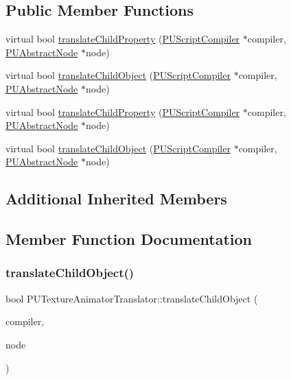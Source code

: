 \subsection*{Public Member Functions}
\begin{DoxyCompactItemize}
\item 
virtual bool \hyperlink{classPUTextureAnimatorTranslator_ae1e941014e7aef7397e11a0b46a4419a}{translate\+Child\+Property} (\hyperlink{classPUScriptCompiler}{P\+U\+Script\+Compiler} $\ast$compiler, \hyperlink{classPUAbstractNode}{P\+U\+Abstract\+Node} $\ast$node)
\item 
virtual bool \hyperlink{classPUTextureAnimatorTranslator_a674892250339a1dbe3ac6a794fdb3205}{translate\+Child\+Object} (\hyperlink{classPUScriptCompiler}{P\+U\+Script\+Compiler} $\ast$compiler, \hyperlink{classPUAbstractNode}{P\+U\+Abstract\+Node} $\ast$node)
\item 
virtual bool \hyperlink{classPUTextureAnimatorTranslator_a268f600cea9abcf17f82a8fb58620bdd}{translate\+Child\+Property} (\hyperlink{classPUScriptCompiler}{P\+U\+Script\+Compiler} $\ast$compiler, \hyperlink{classPUAbstractNode}{P\+U\+Abstract\+Node} $\ast$node)
\item 
virtual bool \hyperlink{classPUTextureAnimatorTranslator_ad16b7551c63fa2810daa385bf4083dba}{translate\+Child\+Object} (\hyperlink{classPUScriptCompiler}{P\+U\+Script\+Compiler} $\ast$compiler, \hyperlink{classPUAbstractNode}{P\+U\+Abstract\+Node} $\ast$node)
\end{DoxyCompactItemize}
\subsection*{Additional Inherited Members}


\subsection{Member Function Documentation}
\mbox{\label{classPUTextureAnimatorTranslator_a674892250339a1dbe3ac6a794fdb3205}} 
\subsubsection{\texorpdfstring{translate\+Child\+Object()}{translateChildObject()}\hspace{0.1cm}{\footnotesize\ttfamily [1/2]}}
{\footnotesize\ttfamily bool P\+U\+Texture\+Animator\+Translator\+::translate\+Child\+Object (\begin{DoxyParamCaption}\item[{\hyperlink{classPUScriptCompiler}{P\+U\+Script\+Compiler} $\ast$}]{compiler,  }\item[{\hyperlink{classPUAbstractNode}{P\+U\+Abstract\+Node} $\ast$}]{node }\end{DoxyParamCaption})\hspace{0.3cm}{\ttfamily [virtual]}}

